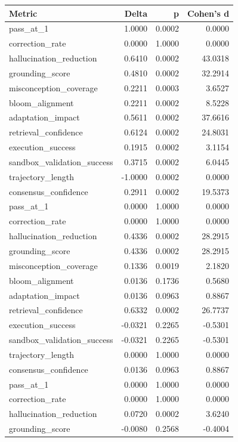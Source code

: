 \begin{tabular}{lrrr}
\toprule
Metric & Delta & p & Cohen's d \\
\midrule
pass\_at\_1 & 1.0000 & 0.0002 & 0.0000 \\
correction\_rate & 0.0000 & 1.0000 & 0.0000 \\
hallucination\_reduction & 0.6410 & 0.0002 & 43.0318 \\
grounding\_score & 0.4810 & 0.0002 & 32.2914 \\
misconception\_coverage & 0.2211 & 0.0003 & 3.6527 \\
bloom\_alignment & 0.2211 & 0.0002 & 8.5228 \\
adaptation\_impact & 0.5611 & 0.0002 & 37.6616 \\
retrieval\_confidence & 0.6124 & 0.0002 & 24.8031 \\
execution\_success & 0.1915 & 0.0002 & 3.1154 \\
sandbox\_validation\_success & 0.3715 & 0.0002 & 6.0445 \\
trajectory\_length & -1.0000 & 0.0002 & 0.0000 \\
consensus\_confidence & 0.2911 & 0.0002 & 19.5373 \\
pass\_at\_1 & 0.0000 & 1.0000 & 0.0000 \\
correction\_rate & 0.0000 & 1.0000 & 0.0000 \\
hallucination\_reduction & 0.4336 & 0.0002 & 28.2915 \\
grounding\_score & 0.4336 & 0.0002 & 28.2915 \\
misconception\_coverage & 0.1336 & 0.0019 & 2.1820 \\
bloom\_alignment & 0.0136 & 0.1736 & 0.5680 \\
adaptation\_impact & 0.0136 & 0.0963 & 0.8867 \\
retrieval\_confidence & 0.6332 & 0.0002 & 26.7737 \\
execution\_success & -0.0321 & 0.2265 & -0.5301 \\
sandbox\_validation\_success & -0.0321 & 0.2265 & -0.5301 \\
trajectory\_length & 0.0000 & 1.0000 & 0.0000 \\
consensus\_confidence & 0.0136 & 0.0963 & 0.8867 \\
pass\_at\_1 & 0.0000 & 1.0000 & 0.0000 \\
correction\_rate & 0.0000 & 1.0000 & 0.0000 \\
hallucination\_reduction & 0.0720 & 0.0002 & 3.6240 \\
grounding\_score & -0.0080 & 0.2568 & -0.4004 \\

\end{tabular}
